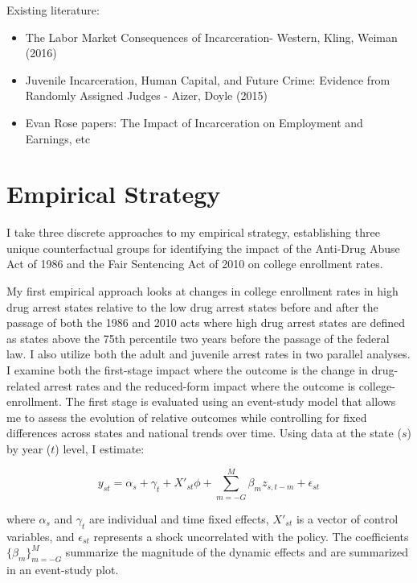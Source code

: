 \documentclass{article}
\begin{document}
Existing literature:
\begin{itemize}[itemsep=0.05mm, parsep=0pt]
  \item The Labor Market Consequences of Incarceration- Western, Kling, Weiman (2016)
  \item Juvenile Incarceration, Human Capital, and Future Crime: Evidence from Randomly Assigned Judges - Aizer, Doyle (2015)
  \item Evan Rose papers: The Impact of Incarceration on Employment and Earnings, etc
\end{itemize}



\section{Empirical Strategy}

I take three discrete approaches to my empirical strategy, establishing three unique counterfactual groups for identifying the impact of the Anti-Drug Abuse Act of 1986 and the Fair Sentencing Act of 2010 on college enrollment rates. 

My first empirical approach looks at changes in college enrollment rates in high drug arrest states relative to the low drug arrest states before and after the passage of both the 1986 and 2010 acts where high drug arrest states are defined as states above the 75th percentile two years before the passage of the federal law. I also utilize both the adult and juvenile arrest rates in two parallel analyses. I examine both the first-stage impact where the outcome is the change in drug-related arrest rates and the reduced-form impact where the outcome is college-enrollment. The first stage is evaluated using an event-study model that allows me to assess the evolution of relative outcomes while controlling for fixed differences across states and national trends over time. Using data at the state ($s$) by year ($t$) level, I estimate:

\begin{equation} \label{eq:state_level_es}
  y_{st} = \alpha_s + \gamma_t + X'_{st} \phi + \sum_{m=-G}^{M} \beta_m z_{s,t-m} + \epsilon_{st}
\end{equation}

where $\alpha_s$ and $\gamma_t$ are individual and time fixed effects, $X'_{st}$ is a vector of control variables, and $\epsilon_{st}$ represents a shock uncorrelated with the policy. The coefficients $\{\beta_m \}^{M}_{m=-G}$ summarize the magnitude of the dynamic effects and are summarized in an event-study plot.
\end{document}
